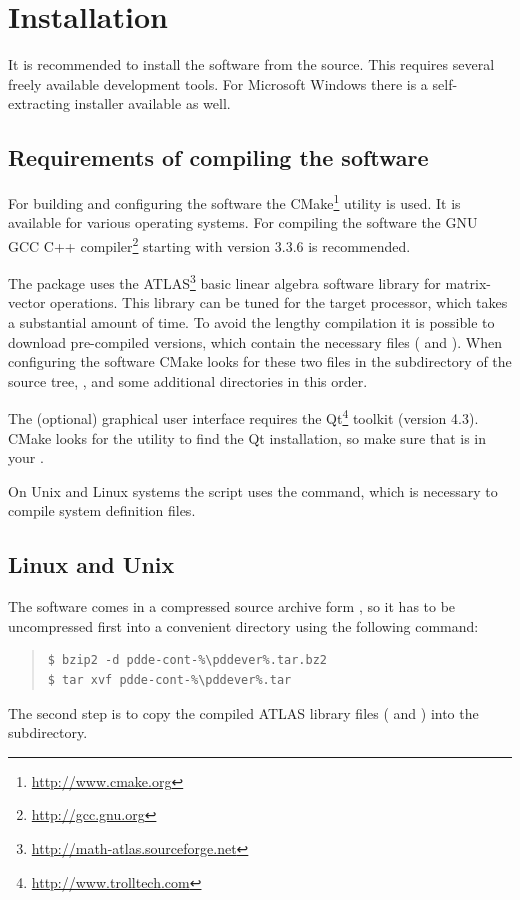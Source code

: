 \documentclass[10pt,a4paper]{ddedoc}
\begin{document}
\section{Installation}

It is recommended to install the software from the source. This requires several freely
available development tools. For Microsoft Windows there is a self-extracting installer
available as well.

\subsection{Requirements of compiling the software}

For building and configuring the software the CMake\footnote{\url{http://www.cmake.org}}
utility is used. It is available for various operating systems. For compiling 
the software the GNU GCC C++ compiler\footnote{\url{http://gcc.gnu.org}} starting with 
version 3.3.6 is recommended.

The package uses the ATLAS\footnote{\url{http://math-atlas.sourceforge.net}}
basic linear algebra software library for matrix-vector operations. This library can be
tuned for the target processor, which takes a substantial amount of time.
To avoid the lengthy compilation it is possible to download
pre-compiled versions, which contain the necessary files ( and
). When configuring the software CMake looks for these two files
in the  subdirectory of the source tree, ,  
and some additional directories in this order.

The (optional) graphical user interface requires the Qt\footnote{\url{http://www.trolltech.com}} 
toolkit (version 4.3). CMake looks for the  utility to find the Qt
installation, so make sure that  is in your .

On Unix and Linux systems the  script uses
the  command, which is necessary to compile system definition files.

\subsection{Linux and Unix}

The software comes in a compressed source archive form
, so it has to be uncompressed first into a
convenient directory using the following command:
{ \small \begin{quote} \begin{lstlisting}[basicstyle=\ttfamily,frame=single]
$ bzip2 -d pdde-cont-%\pddever%.tar.bz2
$ tar xvf pdde-cont-%\pddever%.tar
\end{lstlisting} \end{quote} } \noindent
The second step is to copy the compiled ATLAS library files (
and ) into the
 subdirectory.
\end{document}
